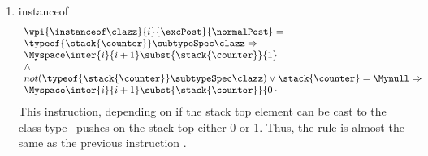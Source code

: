\begin{itemize}
\begin{enumerate}
						\item instanceof
						$$ \begin{array}{l}
                                                    \wpi{\instanceof  \clazz } {i} {\excPost}{\normalPost}  = \\
							 \typeof{ \stack{\counter}} \subtypeSpec \clazz  \Rightarrow \\
								\Myspace  	 \inter{i}{i+1} \subst{ \stack{\counter } } {  1  } \\
									 \wedge \\
								not(  \typeof{\stack{\counter}} \subtypeSpec  \clazz  )  \vee  \stack{\counter} = \Mynull \Rightarrow \\
								\Myspace   \inter{i}{i+1} \subst{  \stack{\counter } }{ 0 } \\	  
						\end{array} 	$$
						  This instruction, depending on if the stack top element can be cast to the class type \clazz \ pushes on the stack 
						  top either 0 or 1.
						  Thus, the rule is almost the same as the previous instruction \checkcast.
					

\end{enumerate}
\end{itemize}
